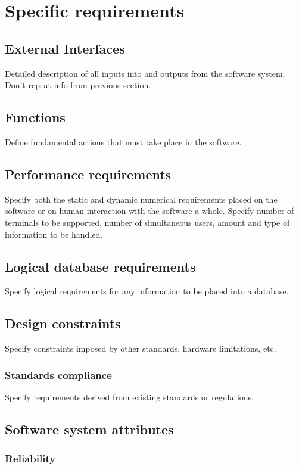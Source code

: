 \documentclass[letterpaper,10pt,draftclsnofoot,onecolumn,titlepage]{IEEEtran}
\begin{document}
	\section{Specific requirements}
	\subsection{External Interfaces}
	Detailed description of all inputs into and outputs from the software system. Don't repeat info from previous section.
	
	\subsection{Functions}
	Define fundamental actions that must take place in the software.
	
	\subsection{Performance requirements}
	Specify both the static and dynamic numerical requirements placed on the software or on human interaction with the software a whole.
	Specify number of terminals to be supported, number of simultaneous users, amount and type of information to be handled. 
	
	\subsection{Logical database requirements}
	Specify logical requirements for any information to be placed into a database.
	
	\subsection{Design constraints}
	Specify constraints imposed by other standards, hardware limitations, etc.
	
	\subsubsection{Standards compliance}
	Specify requirements derived from existing standards or regulations. 
	
	\subsection{Software system attributes}
	\subsubsection{Reliability}
\end{document}
